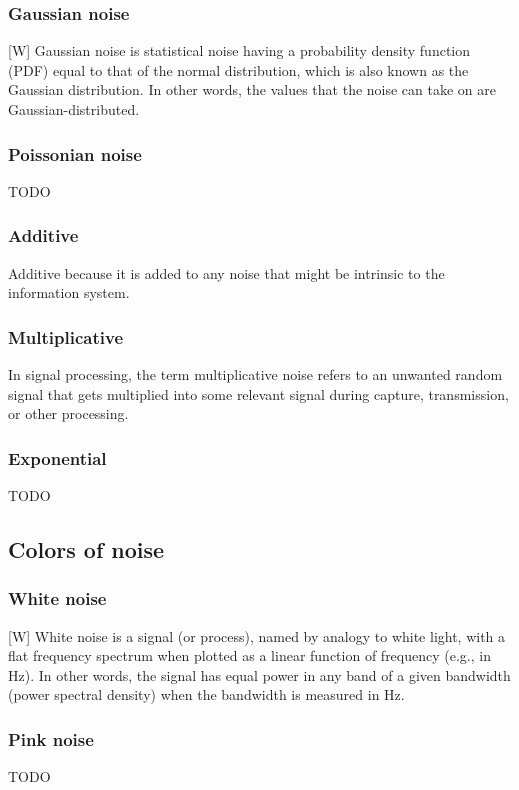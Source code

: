\documentclass[12pt]{article}
\begin{document}
	\subsubsection{Gaussian noise}
	[W] Gaussian noise is statistical noise having a probability density function (PDF) equal to 
	that of the normal distribution, which is also known as the Gaussian distribution. In other
	words, the values that the noise can take on are Gaussian-distributed.
	
	\subsubsection{Poissonian noise}
	TODO
	
	\subsubsection{Additive}
    
    Additive because it is added to any noise that might be intrinsic to the information system.
	
	\subsubsection{Multiplicative}
	In signal processing, the term multiplicative noise refers to an unwanted random signal that 
	gets multiplied into some relevant signal during capture, transmission, or other processing.
	\subsubsection{Exponential}
	TODO
	
	\subsection{Colors of noise}
	\subsubsection{White noise}
	[W] White noise is a signal (or process), named by analogy to white light, with a flat frequency
	spectrum when plotted as a linear function of frequency (e.g., in Hz). In other words, the signal 
	has equal power in any band of a given bandwidth (power spectral density) when the bandwidth is 
	measured in Hz. 
	\subsubsection{Pink noise}
	TODO
\end{document}
